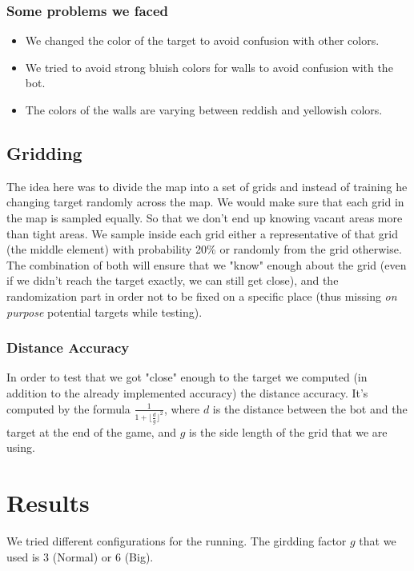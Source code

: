 \documentclass[a4paper]{article}
\begin{document}
\subsubsection{Some problems we faced}
\begin{itemize}
    \item We changed the color of the target to avoid confusion with other colors.
    \item We tried to avoid strong bluish colors for walls to avoid confusion with the bot.
    \item The colors of the walls are varying between reddish and yellowish colors.
\end{itemize}

\subsection{Gridding}
The idea here was to divide the map into a set of grids and instead of training he changing target randomly across the map.
We would make sure that each grid in the map is sampled equally. So that we don't end up knowing vacant areas more than tight areas.
We sample inside each grid either a representative of that grid (the middle element) with probability 20\% or randomly from the grid otherwise. The combination of both will ensure that we "know" enough about the grid (even if we didn't reach the target exactly, we can still get close), and the randomization part in order not to be fixed on a specific place (thus missing {\it on purpose} potential targets while testing).

\subsubsection{Distance Accuracy}
In order to test that we got "close" enough to the target we computed (in addition to the already implemented accuracy) the distance accuracy.
It's computed by the formula $\frac{1}{1 + {\lfloor \frac{d}{g} \rfloor}^2}$, where $d$ is the distance between the bot and the target at the end of the game, and $g$ is the side length of the grid that we are using.

\section{Results}
We tried different configurations for the running. The girdding factor $g$ that we used is $3$ (Normal) or $6$ (Big).
\end{document}
